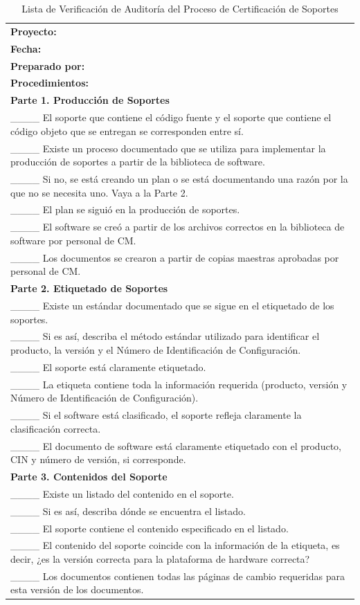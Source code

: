 \begin{table}[H]
\centering
\caption{Lista de Verificación de Auditoría del Proceso de Certificación de Soportes}
\label{fig:b12}
\begin{tabular}{|p{14cm}|}
\hline
\textbf{Proyecto:} \\
\textbf{Fecha:} \\
\textbf{Preparado por:} \\
\hline
\textbf{Procedimientos:} \\
\textbf{Parte 1. Producción de Soportes} \\
\_\_\_\_ El soporte que contiene el código fuente y el soporte que contiene el código objeto que se entregan se corresponden entre sí. \\
\_\_\_\_ Existe un proceso documentado que se utiliza para implementar la producción de soportes a partir de la biblioteca de software. \\
\_\_\_\_ Si no, se está creando un plan o se está documentando una razón por la que no se necesita uno. Vaya a la Parte 2. \\
\_\_\_\_ El plan se siguió en la producción de soportes. \\
\_\_\_\_ El software se creó a partir de los archivos correctos en la biblioteca de software por personal de CM. \\
\_\_\_\_ Los documentos se crearon a partir de copias maestras aprobadas por personal de CM. \\
\textbf{Parte 2. Etiquetado de Soportes} \\
\_\_\_\_ Existe un estándar documentado que se sigue en el etiquetado de los soportes. \\
\_\_\_\_ Si es así, describa el método estándar utilizado para identificar el producto, la versión y el Número de Identificación de Configuración. \\
\_\_\_\_ El soporte está claramente etiquetado. \\
\_\_\_\_ La etiqueta contiene toda la información requerida (producto, versión y Número de Identificación de Configuración). \\
\_\_\_\_ Si el software está clasificado, el soporte refleja claramente la clasificación correcta. \\
\_\_\_\_ El documento de software está claramente etiquetado con el producto, CIN y número de versión, si corresponde. \\
\textbf{Parte 3. Contenidos del Soporte} \\
\_\_\_\_ Existe un listado del contenido en el soporte. \\
\_\_\_\_ Si es así, describa dónde se encuentra el listado. \\
\_\_\_\_ El soporte contiene el contenido especificado en el listado. \\
\_\_\_\_ El contenido del soporte coincide con la información de la etiqueta, es decir, ¿es la versión correcta para la plataforma de hardware correcta? \\
\_\_\_\_ Los documentos contienen todas las páginas de cambio requeridas para esta versión de los documentos. \\
\hline
\end{tabular}
\end{table}

